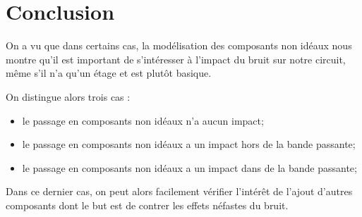 \documentclass{article}
\begin{document}
\section*{Conclusion}

On a vu que dans certains cas, la modélisation des composants non idéaux nous montre qu’il est important de s’intéresser à l’impact du bruit sur notre circuit, même s’il n’a qu’un étage et est plutôt basique.

On distingue alors trois cas :
\begin{itemize}
    \item le passage en composants non idéaux n’a aucun impact;
    \item le passage en composants non idéaux a un impact hors de la bande passante;
    \item le passage en composants non idéaux a un impact dans de la bande passante;
\end{itemize}

Dans ce dernier cas, on peut alors facilement vérifier l’intérêt de l’ajout d’autres composants dont le but est de contrer les effets néfastes du bruit.
\end{document}
